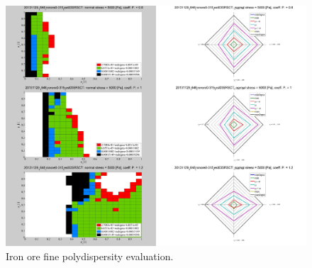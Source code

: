 \begin{figure}[!htb]
\centering
\includegraphics[width=.96\columnwidth]{images/082ironore0315}
\caption[Iron ore fine polydispersity evaluation]{Iron ore fine polydispersity evaluation.}
\label{fig:082ironore0315}
\end{figure}